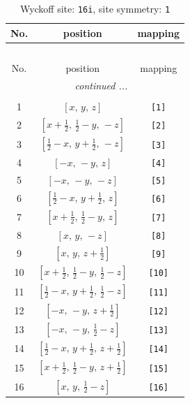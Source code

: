 \documentclass[fleqn,8pt]{jsarticle}
\begin{document}
\begin{longtable}{ccc}
\caption{Wyckoff site: {\tt 16i}, site symmetry: {\tt 1}}
 \\
 \hline \hline
No. & position & mapping \\ \hline \endfirsthead

\multicolumn{2}{l}{\tablename\ \thetable{}} \\
 \hline \hline
No. & position & mapping \\ \hline \endhead

 \hline \hline
\multicolumn{2}{r}{\footnotesize\it continued ...} \\ \endfoot

 \hline \hline
\multicolumn{2}{r}{} \\ \endlastfoot

1 & $\left[ x,\, y,\, z \right]$ & {\tt [1]} \\ \hline
2 & $\left[ x + \frac{1}{2},\, \frac{1}{2} - y,\, - z \right]$ & {\tt [2]} \\ \hline
3 & $\left[ \frac{1}{2} - x,\, y + \frac{1}{2},\, - z \right]$ & {\tt [3]} \\ \hline
4 & $\left[ - x,\, - y,\, z \right]$ & {\tt [4]} \\ \hline
5 & $\left[ - x,\, - y,\, - z \right]$ & {\tt [5]} \\ \hline
6 & $\left[ \frac{1}{2} - x,\, y + \frac{1}{2},\, z \right]$ & {\tt [6]} \\ \hline
7 & $\left[ x + \frac{1}{2},\, \frac{1}{2} - y,\, z \right]$ & {\tt [7]} \\ \hline
8 & $\left[ x,\, y,\, - z \right]$ & {\tt [8]} \\ \hline
9 & $\left[ x,\, y,\, z + \frac{1}{2} \right]$ & {\tt [9]} \\ \hline
10 & $\left[ x + \frac{1}{2},\, \frac{1}{2} - y,\, \frac{1}{2} - z \right]$ & {\tt [10]} \\ \hline
11 & $\left[ \frac{1}{2} - x,\, y + \frac{1}{2},\, \frac{1}{2} - z \right]$ & {\tt [11]} \\ \hline
12 & $\left[ - x,\, - y,\, z + \frac{1}{2} \right]$ & {\tt [12]} \\ \hline
13 & $\left[ - x,\, - y,\, \frac{1}{2} - z \right]$ & {\tt [13]} \\ \hline
14 & $\left[ \frac{1}{2} - x,\, y + \frac{1}{2},\, z + \frac{1}{2} \right]$ & {\tt [14]} \\ \hline
15 & $\left[ x + \frac{1}{2},\, \frac{1}{2} - y,\, z + \frac{1}{2} \right]$ & {\tt [15]} \\ \hline
16 & $\left[ x,\, y,\, \frac{1}{2} - z \right]$ & {\tt [16]} \\
\end{longtable}
\end{document}
